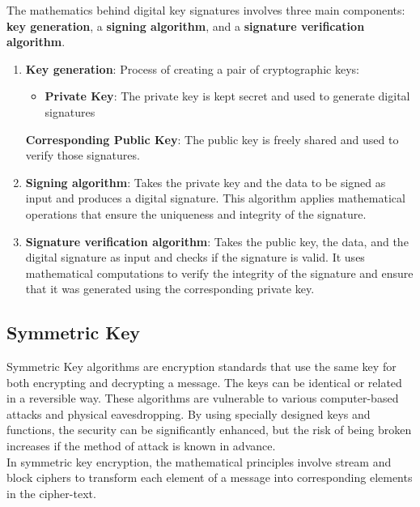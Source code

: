 \documentclass[12pt]{extarticle}
\begin{document}
The mathematics behind digital key signatures involves three main components: \textbf{key generation}, a \textbf{signing algorithm}, and a \textbf{signature verification algorithm}.
\begin{enumerate}
    \item \textbf{Key generation}: Process of creating a pair of cryptographic keys: 
    \begin{itemize}
        \item \textbf{Private Key}: The private key is kept secret and used to generate digital signatures
    \end{itemize} \textbf{Corresponding Public Key}: The public key is freely shared and used to verify those signatures.
    
\item \textbf{Signing algorithm}: Takes the private key and the data to be signed as input and produces a digital signature. This algorithm applies mathematical operations that ensure the uniqueness and integrity of the signature.

\item \textbf{Signature verification algorithm}: Takes the public key, the data, and the digital signature as input and checks if the signature is valid. It uses mathematical computations to verify the integrity of the signature and ensure that it was generated using the corresponding private key.

\end{enumerate}

\subsection{Symmetric Key}

Symmetric Key algorithms are encryption standards that use the same key for both encrypting and decrypting a message. The keys can be identical or related in a reversible way. These algorithms are vulnerable to various computer-based attacks and physical eavesdropping. By using specially designed keys and functions, the security can be significantly enhanced, but the risk of being broken increases if the method of attack is known in advance.\cite{src2}\cite{src6}\cite{src7}\\
In symmetric key encryption, the mathematical principles involve stream and block ciphers to transform each element of a message into corresponding elements in the cipher-text. 
\end{document}
